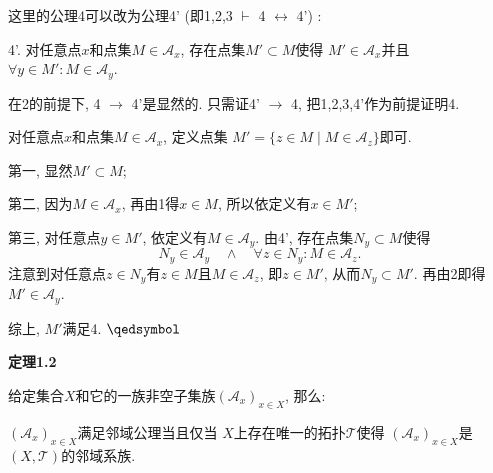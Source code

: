 \documentclass[UTF8]{ctexart}
\begin{document}
\vspace{10pt}

这里的公理4可以改为公理4' (即1,2,3 $\vdash$ 4 $\leftrightarrow$ 4') :

\hspace{-1.1em}
4'. 对任意点$x$和点集$M\in\mathcal{A}_x$, 存在点集$M'\subset M$使得
$M'\in\mathcal{A}_x$并且$\forall y\in M':M\in\mathcal{A}_y$.


在2的前提下, 4 $\to$ 4'是显然的. 只需证4' $\to$ 4, 把1,2,3,4'作为前提证明4.

对任意点$x$和点集$M\in\mathcal{A}_x$, 定义点集
$M'=\{z\in M\mid M\in\mathcal{A}_z\}$即可.

第一, 显然$M'\subset M$;

第二, 因为$M\in\mathcal{A}_x$, 再由1得$x\in M$, 所以依定义有$x\in M'$;

第三, 对任意点$y\in M'$, 依定义有$M\in\mathcal{A}_y$.
由4', 存在点集$N_y\subset M$使得
\[
    N_y\in\mathcal{A}_y\quad\land\quad\forall z\in N_y:M\in\mathcal{A}_z.
\]
注意到对任意点$z\in N_y$有$z\in M$且$M\in\mathcal{A}_z$, 即$z\in M'$,
从而$N_y\subset M'$. 再由2即得$M'\in\mathcal{A}_y$.

综上, $M'$满足4. \hfill $\qedsymbol$





\newpage

\hypertarget{sec:定理1.2}{}
\noindent\textbf{定理1.2}

给定集合$X$和它的一族非空子集族$(\mathcal{A}_x)_{x\in X}$, 那么:

$(\mathcal{A}_x)_{x\in X}$满足邻域公理当且仅当
$X$上存在唯一的拓扑$\mathcal{T}$使得
$(\mathcal{A}_x)_{x\in X}$是$(X,\mathcal{T})$的邻域系族.


\end{document}

